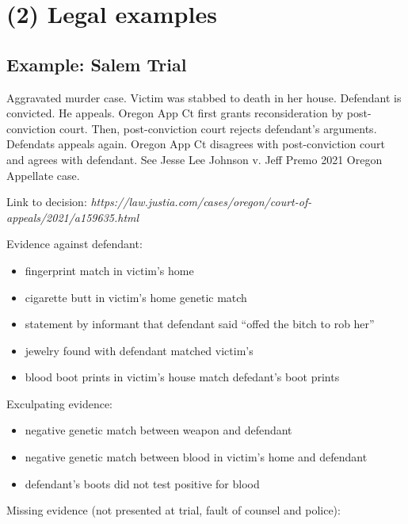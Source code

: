 \documentclass[
  10pt,
  dvipsnames,enabledeprecatedfontcommands]{scrartcl}
\begin{document}
\hypertarget{legal-examples}{%
\section{(2) Legal examples}\label{legal-examples}}

\hypertarget{example-salem-trial}{%
\subsection{Example: Salem Trial}\label{example-salem-trial}}


Aggravated murder case. Victim was stabbed to death in her house.
Defendant is convicted. He appeals. Oregon App Ct first grants
reconsideration by post-conviction court. Then, post-conviction court
rejects defendant's arguments. Defendats appeals again. Oregon App Ct
disagrees with post-conviction court and agrees with defendant. See
Jesse Lee Johnson v. Jeff Premo 2021 Oregon Appellate case.

Link to decision:
\textit{https://law.justia.com/cases/oregon/court-of-appeals/2021/a159635.html}

Evidence against defendant:

\begin{itemize}
\item
  fingerprint match in victim's home
\item
  cigarette butt in victim's home genetic match
\item
  statement by informant that defendant said ``offed the bitch to rob
  her''
\item
  jewelry found with defendant matched victim's
\item
  blood boot prints in victim's house match defedant's boot prints
\end{itemize}

Exculpating evidence:

\begin{itemize}
\item
  negative genetic match between weapon and defendant
\item
  negative genetic match between blood in victim's home and defendant
\item
  defendant's boots did not test positive for blood
\end{itemize}

Missing evidence (not presented at trial, fault of counsel and police):
\end{document}
